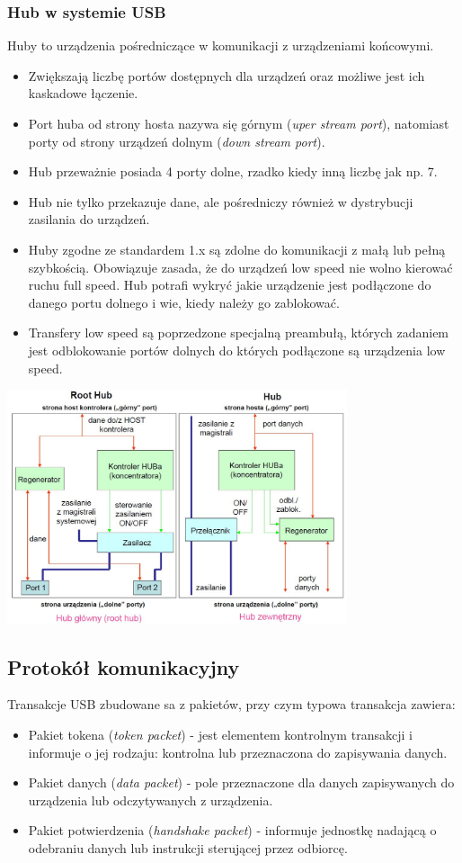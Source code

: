 		\subsubsection{Hub w systemie USB}
		Huby to urządzenia pośredniczące w komunikacji z urządzeniami końcowymi.
		\begin{itemize}
			\item Zwiększają liczbę portów dostępnych dla urządzeń oraz możliwe jest ich kaskadowe łączenie.
			\item Port huba od strony hosta nazywa się górnym (\emph{uper stream port}), natomiast porty od strony urządzeń dolnym (\emph{down stream port}).
			\item Hub przeważnie posiada 4 porty dolne, rzadko kiedy inną liczbę jak np. 7.
			\item Hub nie tylko przekazuje dane, ale pośredniczy również w dystrybucji zasilania do urządzeń.
			\item Huby zgodne ze standardem 1.x są zdolne do komunikacji z małą lub pełną szybkością. Obowiązuje zasada, że do urządzeń low speed nie wolno kierować ruchu full speed. Hub potrafi wykryć jakie urządzenie jest podłączone do danego portu dolnego i wie, kiedy należy go zablokować.
			\item Transfery low speed są poprzedzone specjalną preambułą, których zadaniem jest odblokowanie portów dolnych do których podłączone są urządzenia low speed.
		\end{itemize}
		\includegraphics[width=10cm]{./wyklady/USB_17_1.jpg}
	
\subsection{Protokół komunikacyjny}
	Transakcje USB zbudowane sa z pakietów, przy czym typowa transakcja zawiera:
	\begin{itemize}
		\item Pakiet tokena (\emph{token packet}) - jest elementem kontrolnym transakcji i informuje o jej rodzaju: kontrolna lub przeznaczona do zapisywania danych.
		\item Pakiet danych (\emph{data packet}) - pole przeznaczone dla danych zapisywanych do urządzenia lub odczytywanych z urządzenia.
		\item Pakiet potwierdzenia (\emph{handshake packet}) - informuje jednostkę nadającą o odebraniu danych lub instrukcji sterującej przez odbiorcę.
	\end{itemize}
